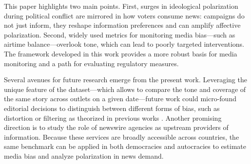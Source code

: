 \documentclass[12pt]{article}
\begin{document}
This paper highlights two main points. First, surges in ideological polarization during political conflict are mirrored in how voters consume news: campaigns do not just inform, they reshape information preferences and can amplify affective polarization. Second, widely used metrics for monitoring media bias—such as airtime balance—overlook tone, which can lead to poorly targeted interventions. The  framework developed in this work provides a more robust basis for media monitoring and a path for evaluating regulatory measures.



Several avenues for future research emerge from the present work. Leveraging the unique feature of the dataset—which allows to compare the tone and coverage of the same story across outlets on a given date—future work could micro-found editorial decisions  to distinguish between different forms of bias, such as distortion or filtering as theorized in previous works \citep[e.g.][]{gentzkow2014media}. Another promising direction is to study the role of newswire agencies as  upstream providers of information.  Because these services are broadly accessible across countries, the same benchmark can be applied in both democracies and autocracies to estimate media bias and analyze polarization in news demand.







	
	
	
	
	
	
	
	
	\clearpage
	
\end{document}
